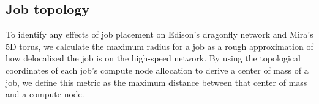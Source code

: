 
\subsection{Job topology} \label{sec:methods/other}

To identify any effects of job placement on Edison's dragonfly network and Mira's 5D torus, we calculate the maximum radius for a job as a rough approximation of how delocalized the job is on the high-speed network.
By using the topological coordinates of each job's compute node allocation to derive a center of mass of a job, we define this metric as the maximum distance between that center of mass and a compute node.

